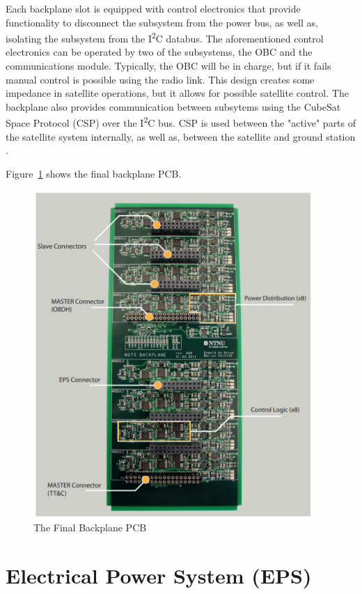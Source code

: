\documentclass[12pt, a4paper]{report}
\begin{document}
Each backplane slot is equipped with control electronics that provide functionality to disconnect the subsystem from the power bus, as well as, isolating the subsystem from the I\textsuperscript{2}C databus. The aforementioned control electronics can be operated by two of the subsystems, the OBC and the communications module. Typically, the OBC will be in charge, but if it fails manual control is possible using the radio link. This design creates some impedance in satellite operations, but it allows for possible satellite control. The backplane also provides communication between subsytems using the CubeSat Space Protocol (CSP) over the I\textsuperscript{2}C bus. CSP is used between the "active" parts of the satellite system internally, as well as, between the satellite and ground station \cite{overview}.

Figure~\ref{fig:backplane_pcb} shows the final backplane PCB.

\begin{figure}[H]
    \centering
    \includegraphics[width=300pt]{images/nuts_backplane_final.PNG}
    \caption{The Final Backplane PCB \cite{power_distribution}}
    \label{fig:backplane_pcb}
\end{figure}

\section{Electrical Power System (EPS)}
\end{document}
